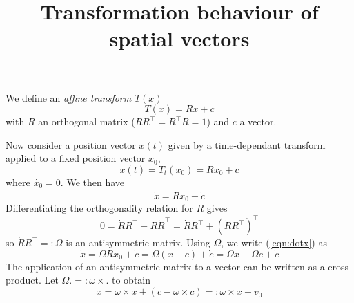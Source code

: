 \documentclass[a4paper]{article}
\begin{document}
\title{Transformation behaviour of spatial vectors}
\maketitle
We define an \textit{affine transform} $T(x)$
\begin{equation}
\label{eqn:atdef}
T(x) = Rx + c
\end{equation}
with $R$ an orthogonal matrix ($R R^\top = R^\top R = 1$) and $c$ a vector.

Now consider a position vector $x(t)$ given by a time-dependant transform applied to a fixed position vector $x_0$,
\begin{equation}
x(t) = T_t(x_0) = R x_0 + c
\end{equation}
where $\dot{x_0} = 0$. We then have
\begin{equation}
\label{eqn:dotx}
\dot{x} = \dot{R} x_0 + \dot{c}
\end{equation}
Differentiating the orthogonality relation for $R$ gives
\begin{equation}
0 = \dot{R} R^\top + R \dot{R}^\top = \dot{R} R^\top + (\dot{R} R^\top)^\top
\end{equation}
so $\dot{R} R^\top =: \Omega$ is an antisymmetric matrix. Using $\Omega$, we write (\ref{eqn:dotx}) as
\begin{equation}
\dot{x} = \Omega R x_0 + \dot{c} = \Omega (x - c) + \dot{c} = \Omega x - \Omega c + \dot{c}
\end{equation}
The application of an antisymmetric matrix to a vector can be written as a cross product. Let $\Omega . =: \omega \times .$ to obtain
\begin{equation}
\label{eqn:assspvel}
\dot{x} = \omega \times x + (\dot{c} - \omega \times c) =: \omega \times x + v_0
\end{equation}
\end{document}
